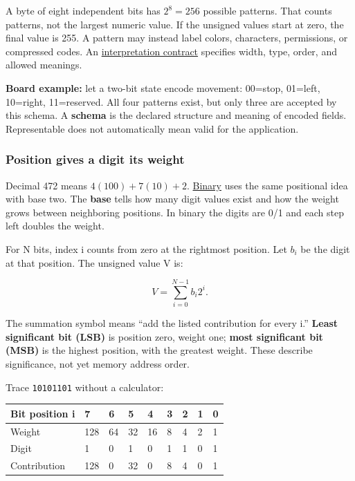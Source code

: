 A byte of eight independent bits has \(2^8=256\) possible patterns. That counts patterns, not the largest numeric value. If the unsigned values start at zero, the final value is 255. A pattern may instead label colors, characters, permissions, or compressed codes. An \hyperref[appendix-f414bd4ed05c]{interpretation contract} specifies width, type, order, and allowed meanings.

\textbf{Board example:} let a two-bit state encode movement: 00=stop, 01=left, 10=right, 11=reserved. All four patterns exist, but only three are accepted by this schema. A \textbf{schema} is the declared structure and meaning of encoded fields. Representable does not automatically mean valid for the application.

\subsubsection{Position gives a digit its weight}\label{01-foundations-i-ch001-position-gives-a-digit-its-weight}

\hypertarget{01-foundations-i-ch001-position-gives-a-digit-its-weight}{}

Decimal 472 means \(4(100)+7(10)+2\). \hyperref[appendix-83c3f28f7bda]{Binary} uses the same positional idea with base two. The \textbf{base} tells how many digit values exist and how the weight grows between neighboring positions. In binary the digits are 0/1 and each step left doubles the weight.

For N bits, index i counts from zero at the rightmost position. Let \(b_i\) be the digit at that position. The unsigned value V is:

\[
V=\sum_{i=0}^{N-1}b_i2^i.
\]

The summation symbol means ``add the listed contribution for every i.'' \textbf{Least significant bit (LSB)} is position zero, weight one; \textbf{most significant bit (MSB)} is the highest position, with the greatest weight. These describe significance, not yet memory address order.

Trace \texttt{10101101} without a calculator:

{\def\LTcaptype{none} %
\begin{longtable}[]{@{}lllllllll@{}}
\toprule\noalign{}
Bit position i & 7 & 6 & 5 & 4 & 3 & 2 & 1 & 0 \\
\midrule\noalign{}
\endhead
\bottomrule\noalign{}
\endlastfoot
Weight & 128 & 64 & 32 & 16 & 8 & 4 & 2 & 1 \\
Digit & 1 & 0 & 1 & 0 & 1 & 1 & 0 & 1 \\
Contribution & 128 & 0 & 32 & 0 & 8 & 4 & 0 & 1 \\
\end{longtable}
}

